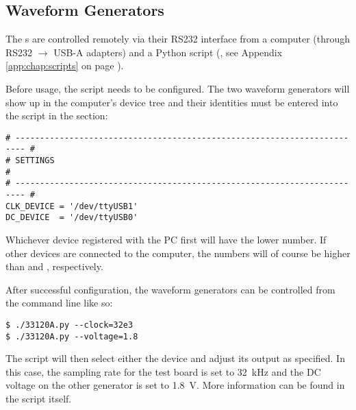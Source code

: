 
\subsection{Waveform Generators}
\label{subsec:33120A}

The  \funcgen  s  are  controlled  remotely via  their  RS232  interface  from
a  computer  (through  RS232  $\rightarrow$   USB-A  adapters)  and  a  Python
script   (,  see   Appendix  \ref{app:chap:scripts}   on  page
\pageref{app:chap:scripts}).

Before usage, the  script needs to be configured. The  two waveform generators
will  show up  in the  computer's  device tree  and their  identities must  be
entered into the script in the  section:

\begin{verbatim}
# ------------------------------------------------------------------------ #
# SETTINGS                                                                 #
# ------------------------------------------------------------------------ #
CLK_DEVICE = '/dev/ttyUSB1'
DC_DEVICE  = '/dev/ttyUSB0'
\end{verbatim}

Whichever  device   registered  with  the   PC  first  will  have   the  lower
 number. If other  devices are connected to  the computer, the
numbers will of course be higher than  and , respectively.

After successful configuration, the waveform generators can be controlled from
the command line like so\footnotemark:

\begin{verbatim}
$ ./33120A.py --clock=32e3
$ ./33120A.py --voltage=1.8
\end{verbatim}

The script will then select either the   device
and adjust  its output as specified. In  this case, the sampling  rate for the
test board  is set  to \SI{32}{\kilo\hertz}  and the DC  voltage on  the other
generator  is set  to \SI{1.8}{\volt}. More  information can  be found  in the
script itself.

